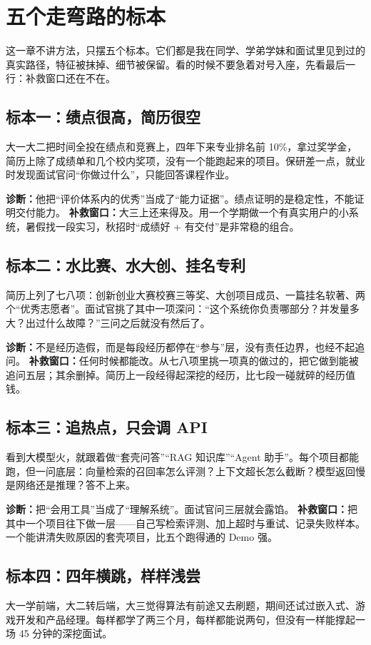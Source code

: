 \documentclass[UTF8,zihao=5,openany]{ctexbook}
\begin{document}
\section{五个走弯路的标本}
这一章不讲方法，只摆五个标本。它们都是我在同学、学弟学妹和面试里见到过的真实路径，特征被抹掉、细节被保留。看的时候不要急着对号入座，先看最后一行：补救窗口还在不在。

\subsection{标本一：绩点很高，简历很空}
大一大二把时间全投在绩点和竞赛上，四年下来专业排名前 10\%，拿过奖学金，简历上除了成绩单和几个校内奖项，没有一个能跑起来的项目。保研差一点，就业时发现面试官问“你做过什么”，只能回答课程作业。

\textbf{诊断：}他把“评价体系内的优秀”当成了“能力证据”。绩点证明的是稳定性，不能证明交付能力。
\textbf{补救窗口：}大三上还来得及。用一个学期做一个有真实用户的小系统，暑假找一段实习，秋招时“成绩好 + 有交付”是非常稳的组合。

\subsection{标本二：水比赛、水大创、挂名专利}
简历上列了七八项：创新创业大赛校赛三等奖、大创项目成员、一篇挂名软著、两个“优秀志愿者”。面试官挑了其中一项深问：“这个系统你负责哪部分？并发量多大？出过什么故障？”三问之后就没有然后了。

\textbf{诊断：}不是经历造假，而是每段经历都停在“参与”层，没有责任边界，也经不起追问。
\textbf{补救窗口：}任何时候都能改。从七八项里挑一项真的做过的，把它做到能被追问五层；其余删掉。简历上一段经得起深挖的经历，比七段一碰就碎的经历值钱。

\subsection{标本三：追热点，只会调 API}
看到大模型火，就跟着做“套壳问答”“RAG 知识库”“Agent 助手”。每个项目都能跑，但一问底层：向量检索的召回率怎么评测？上下文超长怎么截断？模型返回慢是网络还是推理？答不上来。

\textbf{诊断：}把“会用工具”当成了“理解系统”。面试官问三层就会露馅。
\textbf{补救窗口：}把其中一个项目往下做一层——自己写检索评测、加上超时与重试、记录失败样本。一个能讲清失败原因的套壳项目，比五个跑得通的 Demo 强。

\subsection{标本四：四年横跳，样样浅尝}
大一学前端，大二转后端，大三觉得算法有前途又去刷题，期间还试过嵌入式、游戏开发和产品经理。每样都学了两三个月，每样都能说两句，但没有一样能撑起一场 45 分钟的深挖面试。
\end{document}
